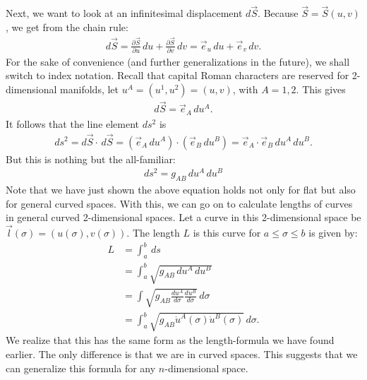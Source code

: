 \documentclass{book}
\theoremstyle{definition}
\begin{document}
Next, we want to look at an infinitesimal displacement $d\vec{S}$. Because $\vec{S} = \vec{S}(u,v)$, we get from the chain rule:
\begin{align*}
d\vec{S} = \frac{\partial \vec{S}}{\partial u}\,du + \frac{\partial\vec{S}}{\partial v}\,dv = \vec{e}_u\,du + \vec{e}_v\,dv.
\end{align*}
For the sake of convenience (and further generalizations in the future), we shall switch to index notation. Recall that capital Roman characters are reserved for 2-dimensional manifolds, let $u^A = (u^1,u^2) = (u,v)$, with $A=1,2$. This gives
\begin{align*}
d\vec{S} = \vec{e}_A\,du^A.
\end{align*}
It follows that the line element $ds^2$ is
\begin{align*}
ds^2 = d\vec{S}\cdot\,d\vec{S} = \left(\vec{e}_A\,du^A \right) \cdot \left( \vec{e}_B\,du^B\right) = \vec{e}_A \cdot \vec{e}_B\,du^A\, du^B.
\end{align*}
But this is nothing but the all-familiar:
\begin{align*}
\boxed{ds^2 = g_{AB}\,du^A\,du^B}
\end{align*}
Note that we have just shown the above equation holds not only for flat but also for general curved spaces. With this, we can go on to calculate lengths of curves in general curved 2-dimensional spaces. Let a curve in this 2-dimensional space be $\vec{l}(\sigma) = (u(\sigma),v(\sigma))$. The length $L$ is this curve for $a \leq \sigma \leq b$ is given by:
\begin{align*}
L &= \int_{a}^{b}\,ds \\
&= \int_{a}^{b}\sqrt{g_{AB}\,du^A\,du^B}\\ 
&= \int\sqrt{g_{AB}\frac{du^A}{d\sigma}\frac{du^B}{d\sigma}}\,d\sigma\\
&= \int_{a}^{b}\sqrt{g_{AB}\dot{u}^{A}(\sigma)\dot{u}^{B}(\sigma)}\,d\sigma.
\end{align*}
We realize that this has the same form as the length-formula we have found earlier. The only difference is that we are in curved spaces. This suggests that we can generalize this formula for any $n$-dimensional space. \\
\end{document}

